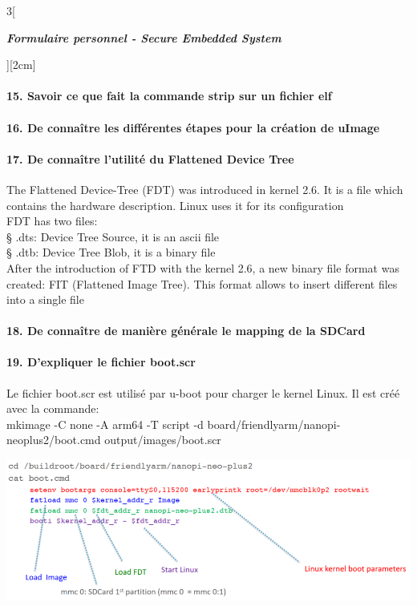 \begin{multicols}{3}[\centerline{ \large\em \textbf{Formulaire personnel - Secure Embedded System}}][2cm]
\paragraph*{15. Savoir ce que fait la commande strip sur un fichier elf\\}
\paragraph*{16. De connaître les différentes étapes pour la création de uImage\\}
\paragraph*{17. De connaître l’utilité du Flattened Device Tree\\}
The Flattened Device-Tree (FDT) was introduced in kernel 2.6. It is a file which
contains the hardware description. Linux uses it for its configuration\\
 FDT has two files:\\
§ .dts: Device Tree Source, it is an ascii file\\
§ .dtb: Device Tree Blob, it is a binary file\\
After the introduction of FTD with the kernel 2.6, a new binary file format was
created: FIT (Flattened Image Tree).  This format allows to insert different files into a single file
\paragraph*{18. De connaître de manière générale le mapping de la SDCard\\}

\paragraph*{19. D’expliquer le fichier boot.scr\\}
Le fichier boot.scr est utilisé par u-boot pour charger le
kernel Linux. Il est créé avec la commande:\\
mkimage -C none -A arm64 -T script -d board/friendlyarm/nanopi-neoplus2/boot.cmd output/images/boot.scr
\begin{minipage}{\linewidth}
	\centering
    \includegraphics[width =0.8\columnwidth]{images/12.png}
\end{minipage}\\


\end{multicols}
